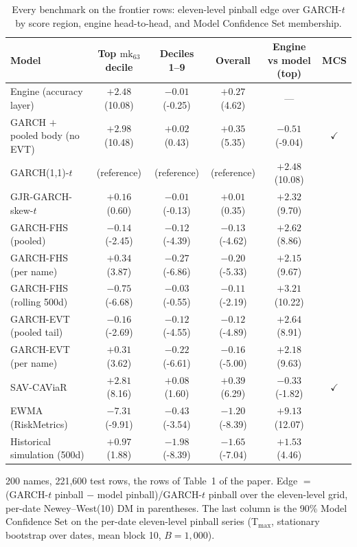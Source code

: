 \documentclass[11pt]{article}
\begin{document}
\begin{table}[htbp]
\centering
\begin{threeparttable}
\caption{Every benchmark on the frontier rows: eleven-level pinball edge over GARCH-$t$ by score region, engine head-to-head, and Model Confidence Set membership.}
\label{tab:bench-pinball}
\footnotesize
\begin{tabular}{lccccc}
\toprule
Model & Top $\mathrm{mk}_{63}$ decile & Deciles 1--9 & Overall & Engine vs model (top) & MCS \\
\midrule
Engine (accuracy layer) & $+2.48$ (10.08) & $-0.01$ (-0.25) & $+0.27$ (4.62) & --- &  \\
GARCH $+$ pooled body (no EVT) & $+2.98$ (10.48) & $+0.02$ (0.43) & $+0.35$ (5.35) & $-0.51$ (-9.04) & $\checkmark$ \\
GARCH(1,1)-$t$ & (reference) & (reference) & (reference) & $+2.48$ (10.08) &  \\
GJR-GARCH-skew-$t$ & $+0.16$ (0.60) & $-0.01$ (-0.13) & $+0.01$ (0.35) & $+2.32$ (9.70) &  \\
GARCH-FHS (pooled) & $-0.14$ (-2.45) & $-0.12$ (-4.39) & $-0.13$ (-4.62) & $+2.62$ (8.86) &  \\
GARCH-FHS (per name) & $+0.34$ (3.87) & $-0.27$ (-6.86) & $-0.20$ (-5.33) & $+2.15$ (9.67) &  \\
GARCH-FHS (rolling 500d) & $-0.75$ (-6.68) & $-0.03$ (-0.55) & $-0.11$ (-2.19) & $+3.21$ (10.22) &  \\
GARCH-EVT (pooled tail) & $-0.16$ (-2.69) & $-0.12$ (-4.55) & $-0.12$ (-4.89) & $+2.64$ (8.91) &  \\
GARCH-EVT (per name) & $+0.31$ (3.62) & $-0.22$ (-6.61) & $-0.16$ (-5.00) & $+2.18$ (9.63) &  \\
SAV-CAViaR & $+2.81$ (8.16) & $+0.08$ (1.60) & $+0.39$ (6.29) & $-0.33$ (-1.82) & $\checkmark$ \\
EWMA (RiskMetrics) & $-7.31$ (-9.91) & $-0.43$ (-3.54) & $-1.20$ (-8.39) & $+9.13$ (12.07) &  \\
Historical simulation (500d) & $+0.97$ (1.88) & $-1.98$ (-8.39) & $-1.65$ (-7.04) & $+1.53$ (4.46) &  \\
\bottomrule
\end{tabular}
\begin{tablenotes}\footnotesize
\item 200 names, 221,600 test rows, the rows of Table~1 of the paper. Edge $=$ (GARCH-$t$ pinball $-$ model pinball)/GARCH-$t$ pinball over the eleven-level grid, per-date Newey--West(10) DM in parentheses. The last column is the 90\% Model Confidence Set on the per-date eleven-level pinball series (T$_{\max}$, stationary bootstrap over dates, mean block 10, $B=1{,}000$).
\end{tablenotes}
\end{threeparttable}
\end{table}
\end{document}
